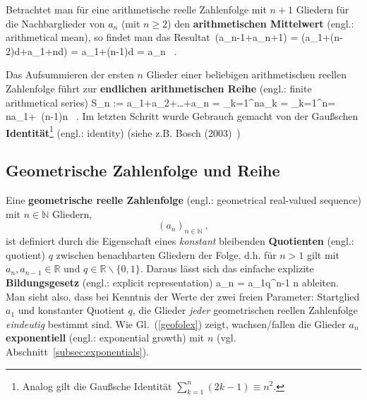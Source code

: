 \medskip
\noindent
Betrachtet man f\"ur eine arithmetische reelle Zahlenfolge
mit $n+1$ Gliedern f\"ur die Nachbarglieder von $a_{n}$
(mit $n \geq 2$) den {\bf arithmetischen Mittelwert} (engl.: 
arithmetical mean), so findet man das Resultat
%
\be
{}\,(a_{n-1}+a_{n+1})
= \left(a_{1}+(n-2)d+a_{1}+nd\right)
= a_{1}+(n-1)d
= a_{n} \ .
\ee
%

\medskip
\noindent
Das Aufsummieren der ersten $n$ Glieder einer beliebigen
arithmetischen reellen Zahlenfolge f\"uhrt zur {\bf endlichen
arithmetischen Reihe} (engl.: finite arithmetical series)
%
\be
S_{n} := a_{1}+a_{2}+\ldots+a_{n} = \sum_{k=1}^{n}a_{k}
= \sum_{k=1}^{n}\left[a_{1} + (k-1)d\right]
= na_{1}+ \,(n-1)n \ .
\ee
%
Im letzten Schritt wurde Gebrauch gemacht von der Gau\ss schen
{\bf Identit\"at}\footnote{Analog gilt die Gau\ss sche Identit\"at
$\displaystyle \sum_{k=1}^{n}(2k-1) \equiv n^{2}$.} (engl.: 
identity) (siehe z.B. Bosch (2003)~)
%
\be
{}
\ee
%

\subsection{Geometrische Zahlenfolge und Reihe}
Eine {\bf geometrische reelle Zahlenfolge} (engl.: geometrical 
real-valued sequence) mit $n \in \mathbb{N}$ Gliedern,
%
\[
(a_{n})_{n \in \mathbb{N}} \ ,
\]
%
ist definiert durch die Eigenschaft eines {\em konstant\/}
bleibenden {\bf Quotienten} (engl.: quotient) $q$ zwischen 
benachbarten Gliedern der Folge, d.h. f\"ur $n>1$ gilt
%
\be
{}
\ee
%
mit $a_{n}, a_{n-1} \in \mathbb{R}$
und $q \in \mathbb{R}\backslash\{0,1\}$.
Daraus l\"asst sich das einfache explizite {\bf Bildungsgesetz} 
(engl.: explicit representation)
%
\be
{}
a_{n} = a_{1}q^{n-1}
\quad{}\quad
n \in {}
\ee
%
ableiten. Man sieht also, dass bei Kenntnis der Werte der zwei
freien Parameter: Startglied $a_{1}$ und konstanter Quotient $q$,
die Glieder {\em jeder\/} geometrischen reellen Zahlenfolge
{\em eindeutig\/} bestimmt sind. Wie Gl.~(\ref{geofolex}) zeigt,
wachsen/fallen die Glieder $a_{n}$ {\bf exponentiell} (engl.: 
exponential growth) mit $n$ (vgl. 
Abschnitt~\ref{subsec:exponentials}).

